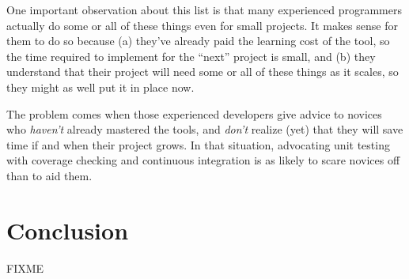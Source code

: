\documentclass[10pt]{article}
\begin{document}
One important observation about this list is that many experienced
programmers actually do some or all of these things even for small
projects. It makes sense for them to do so because (a) they've already
paid the learning cost of the tool, so the time required to implement
for the ``next'' project is small, and (b) they understand that their
project will need some or all of these things as it scales, so they
might as well put it in place now.

The problem comes when those experienced developers give advice to
novices who \emph{haven't} already mastered the tools, and \emph{don't}
realize (yet) that they will save time if and when their project grows.
In that situation, advocating unit testing with coverage checking and
continuous integration is as likely to scare novices off than to aid
them.

\section{Conclusion}\label{conclusion}

FIXME


\end{document}
